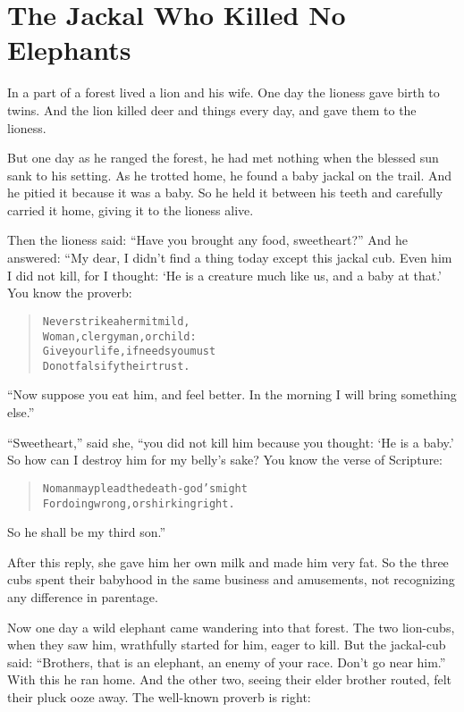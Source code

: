 \documentclass[article, twoside, 14pt]{memoir}
\renewenvironment{verbatim}{%
\begin{quote}%
\vskip -10pt%
\begin{alltt}\normalfont\large}{\end{alltt}%
\end{quote}%
\vskip -10pt
} %
\begin{document}
\chapter{The Jackal Who Killed No Elephants}

\label{s70}

In a part of a forest lived a lion and his wife. One day the
lioness gave birth to twins. And the lion killed deer and things
every day, and gave them to the lioness.

But one day as he ranged the forest, he had met nothing when the
blessed sun sank to his setting. As he trotted home, he found a
baby jackal on the trail. And he pitied it because it was a baby.
So he held it between his teeth and carefully carried it home,
giving it to the lioness alive.

Then the lioness said: ``Have you brought any food, sweetheart?''
And he answered: “My dear, I didn't find a thing today except this
jackal cub. Even him I did not kill, for I thought:
`He is a creature much like us, and a baby at that.' You know the
proverb:

\begin{verbatim}
Never strike a hermit mild,
Woman, clergyman, or child:
Give your life, if needs you must{\textemdash}
Do not falsify their trust.
\end{verbatim}
``Now suppose you eat him, and feel better. In the morning I will bring something else.''

``Sweetheart,'' said she, “you did not kill him because you
thought: `He is a baby.' So how can I destroy him for my belly's
sake? You know the verse of Scripture:

\begin{verbatim}
No man may plead the death-god's might
For doing wrong, or shirking right.
\end{verbatim}
So he shall be my third son.”

After this reply, she gave him her own milk and made him very fat.
So the three cubs spent their babyhood in the same business and
amusements, not recognizing any difference in parentage.

Now one day a wild elephant came wandering into that forest. The
two lion-cubs, when they saw him, wrathfully started for him, eager
to kill. But the jackal-cub said:
``Brothers, that is an elephant, an enemy of your race. Don't go near him.''
With this he ran home. And the other two, seeing their elder
brother routed, felt their pluck ooze away. The well-known proverb
is right:
\end{document}

